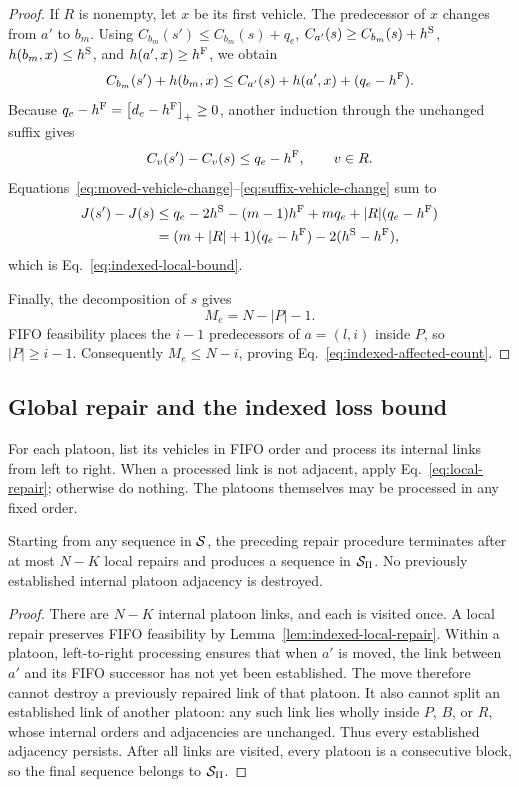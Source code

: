 \begin{proof}
If \(R\) is nonempty, let \(x\) be its first vehicle. The predecessor of
\(x\) changes from \(a'\) to \(b_m\). Using
\(C_{b_m}(s')\le C_{b_m}(s)+q_e\),
\(C_{a'}(s)\ge C_{b_m}(s)+h^{\mathrm{S}}\),
\(h(b_m,x)\le h^{\mathrm{S}}\), and \(h(a',x)\ge h^{\mathrm{F}}\), we obtain
\begin{equation}
C_{b_m}(s')+h(b_m,x)
\le
C_{a'}(s)+h(a',x)+(q_e-h^{\mathrm{F}}).
\end{equation}
Because \(q_e-h^{\mathrm{F}}=\left[d_e-h^{\mathrm{F}}\right]_{+}\ge0\), another induction through the
unchanged suffix gives
\begin{equation}
C_v(s')-C_v(s)
\le q_e-h^{\mathrm{F}},
\qquad v\in R.
\label{eq:suffix-vehicle-change}
\end{equation}
Equations~\eqref{eq:moved-vehicle-change}--\eqref{eq:suffix-vehicle-change}
sum to
\begin{align}
J(s')-J(s)
&\le q_e-2h^{\mathrm{S}}-(m-1)h^{\mathrm{F}}+mq_e+|R|(q_e-h^{\mathrm{F}})\\
&=(m+|R|+1)(q_e-h^{\mathrm{F}})-2(h^{\mathrm{S}}-h^{\mathrm{F}}),
\end{align}
which is Eq.~\eqref{eq:indexed-local-bound}.

Finally, the decomposition of \(s\) gives
\begin{equation}
M_e=N-|P|-1.
\end{equation}
FIFO feasibility places the \(i-1\) predecessors of \(a=(l,i)\) inside
\(P\), so \(|P|\ge i-1\). Consequently \(M_e\le N-i\), proving
Eq.~\eqref{eq:indexed-affected-count}.
\end{proof}

\subsection{Global repair and the indexed loss bound}

For each platoon, list its vehicles in FIFO order and process its internal
links from left to right. When a processed link is not adjacent, apply
Eq.~\eqref{eq:local-repair}; otherwise do nothing. The platoons themselves
may be processed in any fixed order.

\begin{proposition}
\label{prop:global-repair}
Starting from any sequence in \(\mathcal{S}\), the preceding repair procedure
terminates after at most \(N-K\) local repairs and produces a sequence in
\(\mathcal{S}_{\Pi}\). No previously established internal platoon adjacency is
destroyed.
\end{proposition}

\begin{proof}
There are \(N-K\) internal platoon links, and each is visited once. A local
repair preserves FIFO feasibility by Lemma~\ref{lem:indexed-local-repair}.
Within a platoon, left-to-right processing ensures that when \(a'\) is moved,
the link between \(a'\) and its FIFO successor has not yet been established.
The move therefore cannot destroy a previously repaired link of that
platoon. It also cannot split an established link of another platoon: any
such link lies wholly inside \(P\), \(B\), or \(R\), whose internal orders
and adjacencies are unchanged. Thus every established adjacency persists.
After all links are visited, every platoon is a consecutive block, so the
final sequence belongs to \(\mathcal{S}_{\Pi}\).
\end{proof}

